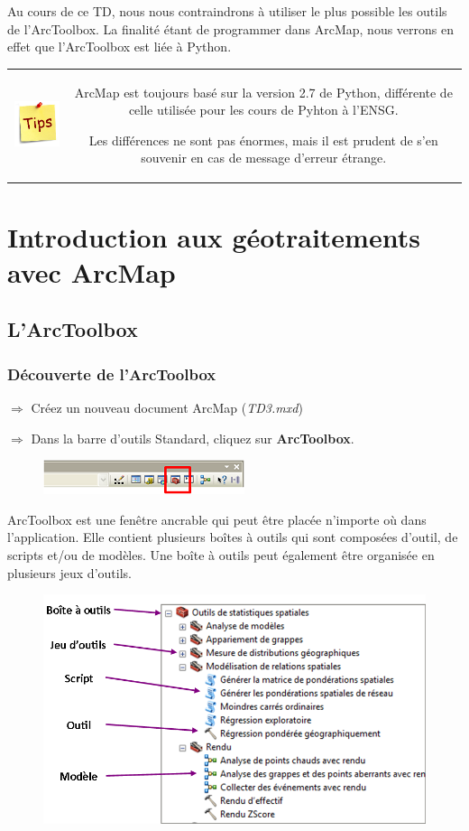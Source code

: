 \documentclass[11pt]{article}
\newcommand{\action}{$\Rightarrow$ }
\newenvironment{note}{%
	\begin{tabular}[t t]{c c}
		\includegraphics{img/tips.png}
		 &
		\begin{minipage}[c]{0.9\linewidth}
			\begin{sffamily}
}{%
			\end{sffamily}
		\end{minipage}
	\end{tabular}	
}
\begin{document}
Au cours de ce TD, nous nous contraindrons à utiliser le plus possible les outils de l'ArcToolbox. La finalité étant de programmer dans ArcMap, nous verrons en effet que l'ArcToolbox est liée à Python.

\begin{note}
ArcMap est toujours basé sur la version 2.7 de Python, différente de celle utilisée pour les cours de Pyhton à l'ENSG.

Les différences ne sont pas énormes, mais il est prudent de s'en souvenir en cas de message d'erreur étrange.
\end{note}



\section{Introduction aux géotraitements avec ArcMap}

\subsection{L'ArcToolbox}
\subsubsection{Découverte de l'ArcToolbox}
\action Créez un nouveau document ArcMap (\textit{TD3.mxd})

\action Dans la barre d'outils Standard, cliquez sur \textbf{ArcToolbox}.
\begin{figure}[H]
	\center \includegraphics{img/td3/arctoolbox_bouton.png}\\
\end{figure}

ArcToolbox est une fenêtre ancrable qui peut être placée n'importe où dans l'application. Elle contient plusieurs boîtes à outils qui sont composées d'outil, de scripts et/ou de modèles. Une boîte à outils peut également être organisée en plusieurs jeux d'outils.
\begin{figure}[H]
	\center \includegraphics{img/td3/arctoolbox_composition.png}\\
\end{figure}
\end{document}
